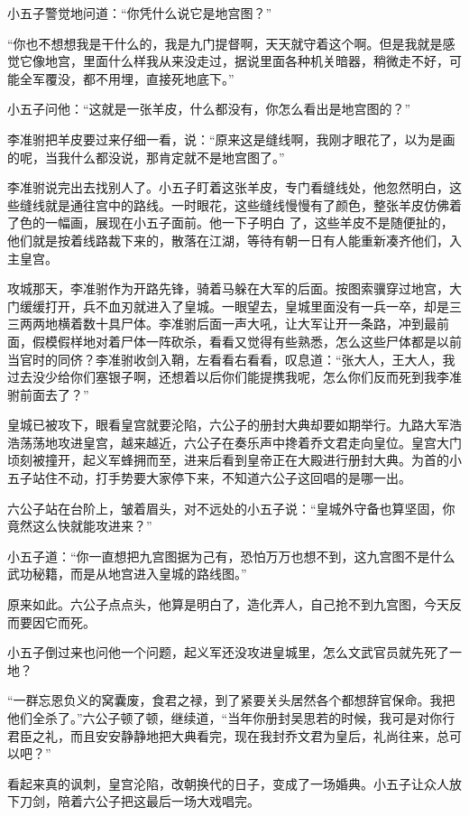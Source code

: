 小五子警觉地问道：“你凭什么说它是地宫图？”

“你也不想想我是干什么的，我是九门提督啊，天天就守着这个啊。但是我就是感觉它像地宫，里面什么样我从来没走过，据说里面各种机关暗器，稍微走不好，可能全军覆没，都不用埋，直接死地底下。”

小五子问他：“这就是一张羊皮，什么都没有，你怎么看出是地宫图的？”

李准驸把羊皮要过来仔细一看，说：“原来这是缝线啊，我刚才眼花了，以为是画的呢，当我什么都没说，那肯定就不是地宫图了。”

李准驸说完出去找别人了。小五子盯着这张羊皮，专门看缝线处，他忽然明白，这些缝线就是通往宫中的路线。一时眼花，这些缝线慢慢有了颜色，整张羊皮仿佛着了色的一幅画，展现在小五子面前。他一下子明白
了，这些羊皮不是随便扯的，他们就是按着线路裁下来的，散落在江湖，等待有朝一日有人能重新凑齐他们，入主皇宫。
\newline

攻城那天，李准驸作为开路先锋，骑着马躲在大军的后面。按图索骥穿过地宫，大门缓缓打开，兵不血刃就进入了皇城。一眼望去，皇城里面没有一兵一卒，却是三三两两地横着数十具尸体。李准驸后面一声大吼，让大军让开一条路，冲到最前面，假模假样地对着尸体一阵砍杀，看看又觉得有些熟悉，怎么这些尸体都是以前当官时的同侪？李准驸收剑入鞘，左看看右看看，叹息道：“张大人，王大人，我过去没少给你们塞银子啊，还想着以后你们能提携我呢，怎么你们反而死到我李准驸前面去了？”

皇城已被攻下，眼看皇宫就要沦陷，六公子的册封大典却要如期举行。九路大军浩浩荡荡地攻进皇宫，越来越近，六公子在奏乐声中搀着乔文君走向皇位。皇宫大门顷刻被撞开，起义军蜂拥而至，进来后看到皇帝正在大殿进行册封大典。为首的小五子站住不动，打手势要大家停下来，不知道六公子这回唱的是哪一出。

六公子站在台阶上，皱着眉头，对不远处的小五子说：“皇城外守备也算坚固，你竟然这么快就能攻进来？”

小五子道：“你一直想把九宫图据为己有，恐怕万万也想不到，这九宫图不是什么武功秘籍，而是从地宫进入皇城的路线图。”

原来如此。六公子点点头，他算是明白了，造化弄人，自己抢不到九宫图，今天反而要因它而死。

小五子倒过来也问他一个问题，起义军还没攻进皇城里，怎么文武官员就先死了一地？

“一群忘恩负义的窝囊废，食君之禄，到了紧要关头居然各个都想辞官保命。我把他们全杀了。”六公子顿了顿，继续道，“当年你册封吴思若的时候，我可是对你行君臣之礼，而且安安静静地把大典看完，现在我封乔文君为皇后，礼尚往来，总可以吧？”

看起来真的讽刺，皇宫沦陷，改朝换代的日子，变成了一场婚典。小五子让众人放下刀剑，陪着六公子把这最后一场大戏唱完。

